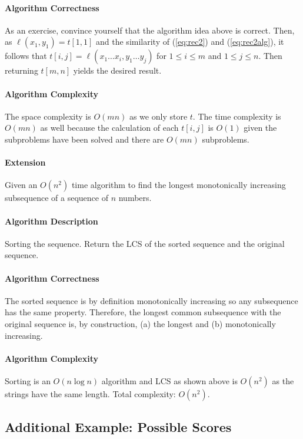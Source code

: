 \documentclass[10pt]{article}
\theoremstyle{plain}
\theoremstyle{definition}
\numberwithin{equation}{section}
\numberwithin{figure}{section}
\begin{document}
\paragraph{Algorithm Correctness} As an exercise, convince yourself that the algorithm idea above is correct. Then, as $\ell(x_1,y_1) = t[1,1]$ and the similarity of (\ref{eq:rec2}) and (\ref{eq:rec2alg}), it follows that $t[i,j] = \ell(x_1 \ldots x_i, y_1 \ldots y_j)$ for $1 \leq i \leq m$ and $1 \leq j \leq n$. Then returning $t[m,n]$ yields the desired result.

\paragraph{Algorithm Complexity} The space complexity is $O(mn)$ as we only store $t$. The time complexity is $O(mn)$ as well because the calculation of each $t[i,j]$ is $O(1)$ given the subproblems have been solved and there are $O(mn)$ subproblems.

\paragraph{Extension} Given an $O(n^2)$ time algorithm to find the longest monotonically increasing subsequence of a sequence of $n$ numbers.

\paragraph{Algorithm Description} Sorting the sequence. Return the LCS of the sorted sequence and the original sequence.

\paragraph{Algorithm Correctness} The sorted sequence is by definition monotonically increasing so any subsequence has the same property. Therefore, the longest common subsequence with the original sequence is, by construction, (a) the longest and (b) monotonically increasing.

\paragraph{Algorithm Complexity} Sorting is an $O(n \log n)$ algorithm and LCS as shown above is $O(n^2)$ as the strings have the same length. Total complexity: $O(n^2)$.

\subsection{Additional Example: Possible Scores}
\end{document}
